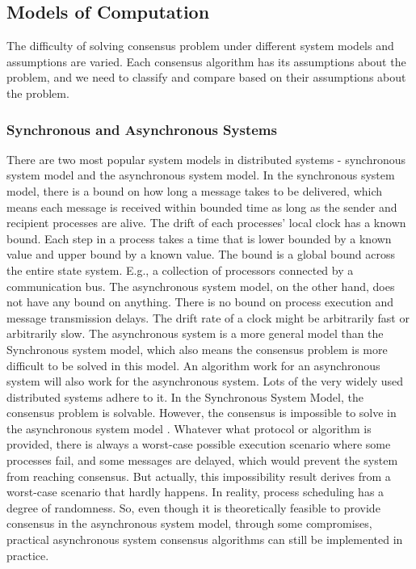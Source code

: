 \documentclass[12pt, a4paper]{article}
\begin{document}
\subsection{Models of Computation}

The difficulty of solving consensus problem under different system models and
assumptions are varied. Each consensus algorithm has its assumptions about the
problem, and we need to classify and compare based on their assumptions about
the problem.

\subsubsection{Synchronous and Asynchronous Systems}

There are two most popular system models in distributed systems - synchronous
system model and the asynchronous system model. In the synchronous system model,
there is a bound on how long a message takes to be delivered, which means each
message is received within bounded time as long as the sender and recipient
processes are alive. The drift of each processes' local clock has a known bound.
Each step in a process takes a time that is lower bounded by a known value and
upper bound by a known value. The bound is a global bound across the entire
state system. E.g., a collection of processors connected by a communication bus.
The asynchronous system model, on the other hand, does not have any bound on
anything. There is no bound on process execution and message transmission
delays. The drift rate of a clock might be arbitrarily fast or arbitrarily slow.
The asynchronous system is a more general model than the Synchronous system
model, which also means the consensus problem is more difficult to be solved in
this model. An algorithm work for an asynchronous system will also work for the
asynchronous system. Lots of the very widely used distributed systems adhere to
it. In the Synchronous System Model, the consensus problem is solvable. However,
the consensus is impossible to solve in the asynchronous system model
\cite{fischer1985impossibility}. Whatever what protocol or algorithm is
provided, there is always a worst-case possible execution scenario where some
processes fail, and some messages are delayed, which would prevent the system
from reaching consensus. But actually, this impossibility result derives from a
worst-case scenario that hardly happens. In reality, process scheduling has a
degree of randomness.\cite{aguilera2010stumbling} So, even though it is
theoretically feasible to provide consensus in the asynchronous system model,
through some compromises, practical asynchronous system consensus algorithms can
still be implemented in practice.
\end{document}
